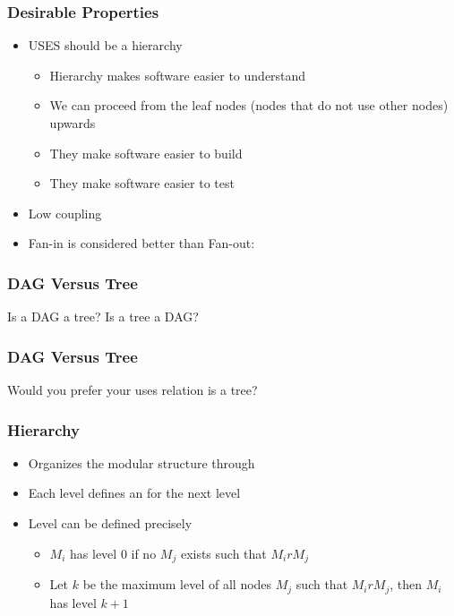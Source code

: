 \documentclass[t,12pt,numbers,fleqn]{beamer}
\begin{document}
\begin{frame}
\frametitle{Desirable Properties}

\begin{itemize}
\item USES should be a hierarchy \cite{Parnas1974}
\begin{itemize}
\item Hierarchy makes software easier to understand
\item We can proceed from the leaf nodes (nodes that do not use other nodes)
  upwards
\item They make software easier to build
\item They make software easier to test
\end{itemize}
\item Low coupling
\item Fan-in is considered better than Fan-out: 
\end{itemize}

\end{frame}


\begin{frame}
\frametitle{DAG Versus Tree}

Is a DAG a tree?  Is a tree a DAG?

\end{frame}


\begin{frame}
\frametitle{DAG Versus Tree}

Would you prefer your uses relation is a tree?

\end{frame}


\begin{frame}
\frametitle{Hierarchy}

\begin{itemize}
\item Organizes the modular structure through 
\item Each level defines an  for the next level
\item Level can be defined precisely
\begin{itemize}
\item $M_i$ has level $0$ if no $M_j$ exists such that $M_i r M_j$
\item Let $k$ be the maximum level of all nodes $M_j$ such that $M_i r M_j$, then $M_i$ has level $k+1$
\end{itemize}
\end{itemize}

\end{frame}
\end{document}
